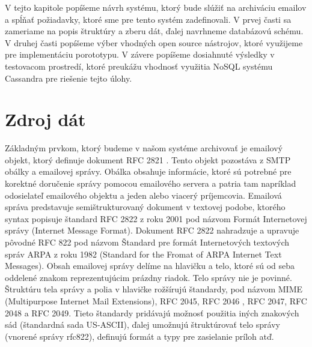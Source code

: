 \documentclass[11pt,twoside,a4paper]{book}
\begin{document}
V tejto kapitole popíšeme návrh systému, ktorý bude slúžiť na archiváciu emailov a spĺňať požiadavky, ktoré sme pre tento systém zadefinovali. V prvej časti sa zameriame na popis štruktúry a zberu dát, ďalej navrhneme databázovú schému. V druhej časti popíšeme výber vhodných open source nástrojov, ktoré využijeme pre implementáciu porototypu. V závere popíšeme dosiahnuté výsledky v testovacom prostredí, ktoré preukážu vhodnosť využitia NoSQL systému Cassandra pre riešenie tejto úlohy.

\section{Zdroj dát}
Základným prvkom, ktorý budeme v našom systéme archivovať je emailový objekt, ktorý definuje dokument RFC 2821 \cite{Klensin:2001:SMT:RFC2821}. Tento objekt pozostáva z SMTP obálky a emailovej správy. Obálka obsahuje informácie, ktoré sú potrebné pre korektné doručenie správy pomocou emailového servera a patria tam napríklad odosielateľ emailového objektu a jeden alebo viacerý príjemcovia. Emailová správa predstavuje semištrukturovaný dokument \cite{Udell} v textovej podobe, ktorého syntax popisuje štandard RFC 2822 \cite{Resnick:2001:IMF:RFC2822} z roku 2001 pod názvom Formát Internetovej správy (Internet Message Format). Dokument RFC 2822 nahradzuje a upravuje pôvodné RFC 822 pod názvom Štandard pre formát Internetových textových správ ARPA z roku 1982 (Standard for the Fromat of ARPA Internet Text Messages). Obsah emailovej správy delíme na hlavičku a telo, ktoré sú od seba oddelené znakom reprezentujúcim prázdny riadok. Telo správy nie je povinné. Štruktúru tela správy a polia v hlavičke rožšírujú štandardy, pod názvom MIME (Multipurpose Internet Mail Extensions), RFC 2045, RFC 2046 \cite{Freed:1996:MIM:RFC2045,Freed:1996:MIM:RFC2046}, RFC 2047, RFC 2048 a RFC 2049. Tieto štandardy pridávajú možnosť použitia iných znakových sád (štandardná sada US-ASCII), ďalej umožnujú štruktúrovať telo správy (vnorené správy rfc822), definujú formát a typy pre zasielanie príloh atď.
\end{document}
